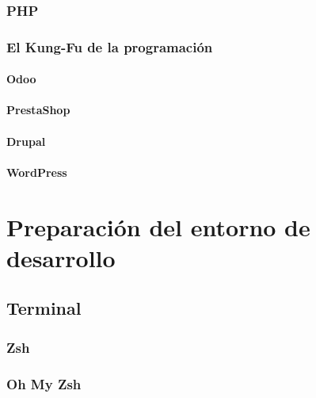\documentclass[a4paper,11pt,spanish]{sphinxmanual}
\begin{document}
\subsubsection{PHP}
\label{\detokenize{introduccion:id18}}

\subsubsection{El Kung-Fu de la programación}
\label{\detokenize{introduccion:id19}}

\paragraph{Odoo}
\label{\detokenize{introduccion:id20}}

\paragraph{PrestaShop}
\label{\detokenize{introduccion:id21}}

\paragraph{Drupal}
\label{\detokenize{introduccion:id22}}

\paragraph{WordPress}
\label{\detokenize{introduccion:id23}}

\section{Preparación del entorno de desarrollo}
\label{\detokenize{introduccion:id24}}

\subsection{Terminal}
\label{\detokenize{introduccion:id25}}

\subsubsection{Zsh}
\label{\detokenize{introduccion:id26}}

\subsubsection{Oh My Zsh}
\label{\detokenize{introduccion:id27}}
\end{document}
